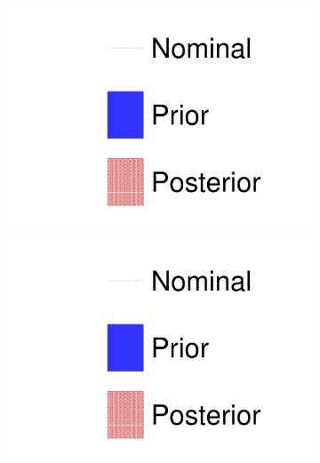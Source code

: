 \begin{figure}[h]
	\begin{subfigure}[t]{0.32\textwidth}
		\includegraphics[width=\textwidth, trim={0mm 0mm 0mm 0mm}, clip, page=1]{figures/mach3/data/prior_error_1june_try_2017_fit_on_sk_spectra}
	\end{subfigure}
	\begin{subfigure}[t]{0.32\textwidth}
		\includegraphics[width=\textwidth, trim={0mm 0mm 0mm 0mm}, clip, page=5]{figures/mach3/data/prior_error_1june_try_2017_fit_on_sk_spectra}
	\end{subfigure}
	\begin{subfigure}[t]{0.32\textwidth}

\end{subfigure}
\end{figure}
